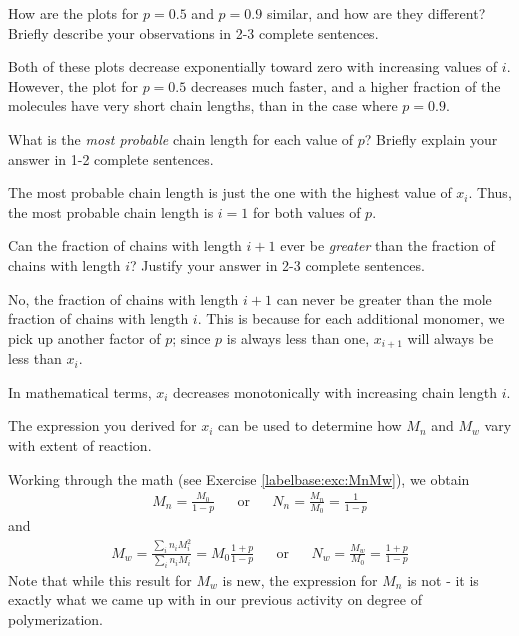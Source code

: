 \begin{activity}
\begin{ctqs}
	\clearpage
	\question How are the plots for $p=0.5$ and $p=0.9$ similar, and how are they different?  Briefly describe your observations in 2-3 complete sentences.
	
		\begin{solution}[1.5in]
		
			Both of these plots decrease exponentially toward zero with increasing values of $i$.  However, the plot for $p=0.5$ decreases much faster, and a higher fraction of the molecules have very short chain lengths, than in the case where $p=0.9$.
		\end{solution}
	
	\question What is the \emph{most probable} chain length for each value of $p$?  Briefly explain your answer in 1-2 complete sentences.
	
		\begin{solution}[1.5in]
		
			The most probable chain length is just the one with the highest value of $x_i$.  Thus, the most probable chain length is $i=1$ for both values of $p$.
		
		\end{solution}
	
	\question Can the fraction of chains with length $i+1$ ever be \emph{greater} than the fraction of chains with length $i$?  Justify your answer in 2-3 complete sentences.
	
		\begin{solution}[1.5in]
		
			No, the fraction of chains with length $i+1$ can never be greater than the mole fraction of chains with length $i$.  This is because for each additional monomer, we pick up another factor of $p$; since $p$ is always less than one, $x_{i+1}$ will always be less than $x_i$.
			
			In mathematical terms, $x_i$ decreases monotonically with increasing chain length $i$.
		
		\end{solution}
	
\end{ctqs}

\clearpage
\begin{model}
\label{\labelbase:mdl:MwMn}

	The expression you derived for $x_i$ can be used to determine how $M_n$ and $M_w$ vary with extent of reaction.
	
	Working through the math (see Exercise \ref{labelbase:exc:MnMw}), we obtain
	\begin{align*}
		M_n = \frac{M_0}{1-p} && \text{or} && N_n = \frac{M_n}{M_0} = \frac{1}{1-p}
	\end{align*}
	and
	\begin{align*}
		M_w = \frac{\sum_i n_i M_i^2}{\sum_i n_i M_i} = M_0\frac{1+p}{1-p} && \text{or} && N_w = \frac{M_w}{M_0} = \frac{1+p}{1-p}
	\end{align*}
	Note that while this result for $M_w$ is new, the expression for $M_n$ is not - it is exactly what we came up with in our previous activity on degree of polymerization.


\end{model}
\end{activity}
